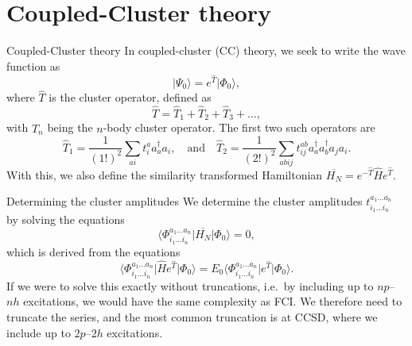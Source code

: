 \documentclass[UKenglish,aspectratio=169]{beamer}
\begin{document}
\section{Coupled-Cluster theory}

\begin{frame}{Coupled-Cluster theory}
    In coupled-cluster (CC) theory, we seek to write the wave function as
    \begin{equation}
        \lvert \Psi_0 \rangle = e^{\hat{T}} \lvert \Phi_0 \rangle,
    \end{equation}
    where $\hat{T}$ is the cluster operator, defined as
    \begin{equation}
        \hat{T} = \hat{T}_1 + \hat{T}_2 + \hat{T}_3 + \ldots,
    \end{equation}
    with $\hat{T}_n$ being the $n$-body cluster operator.
    The first two such operators are
    \begin{equation}
        \hat{T}_1 = \frac{1}{(1!)^2}\sum_{ai} t_i^a a_a^\dagger a_i,
        \quad \text{and} \quad
        \hat{T}_2 = \frac{1}{(2!)^2} \sum_{abij} t_{ij}^{ab} a_a^\dagger a_b^\dagger a_j a_i.
    \end{equation}
    With this, we also define the similarity transformed Hamiltonian $\overline{H_N} = e^{-\hat{T}} \hat{H} e^{\hat{T}}$.
\end{frame}

\begin{frame}{Determining the cluster amplitudes}
    We determine the cluster amplitudes $t_{i_1 \ldots i_n}^{a_1 \ldots a_n}$ by solving the equations
    \begin{equation}
        \Big\langle \Phi_{i_1 \ldots i_n}^{a_1 \ldots a_n} \vert \overline{H_N} \vert \Phi_0 \Big\rangle = 0,
    \end{equation}
    which is derived from the equations
    \begin{equation}
        \Big\langle \Phi_{i_1 \ldots i_n}^{a_1 \ldots a_n} \vert \hat{H}  e^{\hat{T}} \vert \Phi_0 \Big\rangle = E_0 \Big\langle \Phi_{i_1 \ldots i_n}^{a_1 \ldots a_n} \vert e^{\hat{T}} \vert \Phi_0 \Big\rangle.
    \end{equation}
    If we were to solve this exactly without truncations, i.e.\ by including up to $np$--$nh$ excitations, we would have the same complexity as FCI. %
    We therefore need to truncate the series, and the most common truncation is at CCSD, where we include up to $2p$--$2h$ excitations.
\end{frame}
\end{document}

